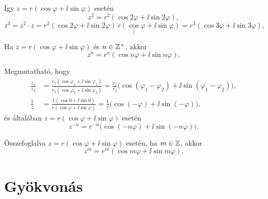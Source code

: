 \documentclass[11pt]{article}
\begin{document}
Így $z=r(\cos\varphi+\ii\sin\varphi)$ esetén
\[
z^{2}=r^{2}(\cos 2\varphi+\ii\sin 2\varphi),
\]
\[
z^{3}=z^{2}\cdot z=r^{2}(\cos 2\varphi+\ii\sin 2\varphi)\,r(\cos\varphi+\ii\sin\varphi)
=r^{3}(\cos 3\varphi+\ii\sin 3\varphi),
\]
\[
\vdots
\]

\begin{thmbox}
\begin{theorem}
Ha $z=r(\cos\varphi+\ii\sin\varphi)$ és $n\in\mathbb{Z}^{+}$, akkor
\begin{equation}\label{eq:hatvany}
z^{n}=r^{n}(\cos n\varphi+\ii\sin n\varphi).
\end{equation}
\end{theorem}
\end{thmbox}

\begin{thmbox}
\begin{proposition}
Megmutatható, hogy
\begin{align}
\frac{z_{1}}{z_{2}}&=\frac{r_{1}(\cos\varphi_{1}+\ii\sin\varphi_{1})}{r_{2}(\cos\varphi_{2}+\ii\sin\varphi_{2})}
=\frac{r_{1}}{r_{2}}\bigl(\cos(\varphi_{1}-\varphi_{2})+\ii\sin(\varphi_{1}-\varphi_{2})\bigr),
\label{eq:polhanyados}\\
\frac{1}{z}&=\frac{1(\cos 0+\ii\sin 0)}{r(\cos\varphi+\ii\sin\varphi)}
=\frac{1}{r}\bigl(\cos(-\varphi)+\ii\sin(-\varphi)\bigr),
\label{eq:reciprok}
\end{align}
és általában $z=r(\cos\varphi+\ii\sin\varphi)$ esetén
\begin{equation}\label{eq:negativkitevo}
z^{-n}=r^{-n}\bigl(\cos(-n\varphi)+\ii\sin(-n\varphi)\bigr).
\end{equation}
\end{proposition}
\end{thmbox}

\begin{thmbox}
\begin{theorem}
Összefoglalva $z=r(\cos\varphi+\ii\sin\varphi)$ esetén, ha $m\in\mathbb{Z}$, akkor
\begin{equation}\label{eq:egeszhatvany}
z^{m}=r^{m}(\cos m\varphi+\ii\sin m\varphi).
\end{equation}
\end{theorem}
\end{thmbox}

\section{Gyökvonás}
\end{document}
